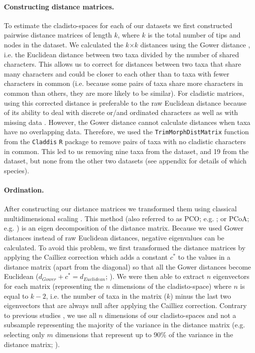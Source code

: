 \documentclass[12pt,a4paper]{article}
\begin{document}
\paragraph{Constructing distance matrices.}
To estimate the cladisto-spaces for each of our datasets we first constructed pairwise distance matrices of length $k$, where $k$ is the total number of tips and nodes in the dataset.
We calculated the $k$$\times$$k$ distances using the Gower distance \citep{Gower71}, i.e. the Euclidean distance between two taxa divided by the number of shared characters. 
This allows us to correct for distances between two taxa that share many characters and could be closer to each other than to taxa with fewer characters in common (i.e. because some pairs of taxa share more characters in common than others, they are more likely to be similar).
For cladistic matrices, using this corrected distance is preferable to the raw Euclidean distance because of its ability to deal with discrete or/and ordinated characters as well as with missing data \citep{anderson2012using}.
However, the Gower distance cannot calculate distances when taxa have no overlapping data.
Therefore, we used the \texttt{TrimMorphDistMatrix} function from the \texttt{Claddis} \texttt{R} package \citep{Claddis} to remove pairs of taxa with no cladistic characters in common.
This led to us removing nine taxa from the \cite{bapst2016topology} dataset, and 19 from the \cite{brusatte2014gradual} dataset, but none from the other two datasets (see appendix for details of which species). 

\paragraph{Ordination.}
After constructing our distance matrices we transformed them using classical multidimensional scaling \citep[MDS;][]{torgerson1965multidimensional,GOWER01121966,cailliez1983analytical}.
This method (also referred to as PCO; e.g. \citealt{Brusatte2015}; or PCoA; e.g. \citealt{paradisape:2004}) is an eigen decomposition of the distance matrix.
Because we used Gower distances instead of raw Euclidean distances, negative eigenvalues can be calculated.
To avoid this problem, we first transformed the distance matrices by applying the Cailliez correction \citep{cailliez1983analytical} which adds a constant $c^*$ to the values in a distance matrix (apart from the diagonal) so that all the Gower distances become Euclidean ($d_{Gower}+c^*=d_{Euclidean}$; \citealt{cailliez1983analytical}). 
We were then able to extract $n$ eigenvectors for each matrix (representing the $n$ dimensions of the cladisto-space) where $n$ is equal to $k-2$, i.e. the number of taxa in the matrix ($k$) minus the last two eigenvectors that are always null after applying the Cailliez correction.
Contrary to previous studies \citep[e.g][]{brusatte50,cisneros2010,prentice2011,anderson2012using,Hughes20082013,bentonmodels2014}, we use all $n$ dimensions of our cladisto-spaces and not a subsample representing the majority of the variance in the distance matrix (e.g. selecting only $m$ dimensions that represent up to 90\% of the variance in the distance matrix; \citealt{Brusatte12092008,toljagictriassic-jurassic2013}).
\end{document}
